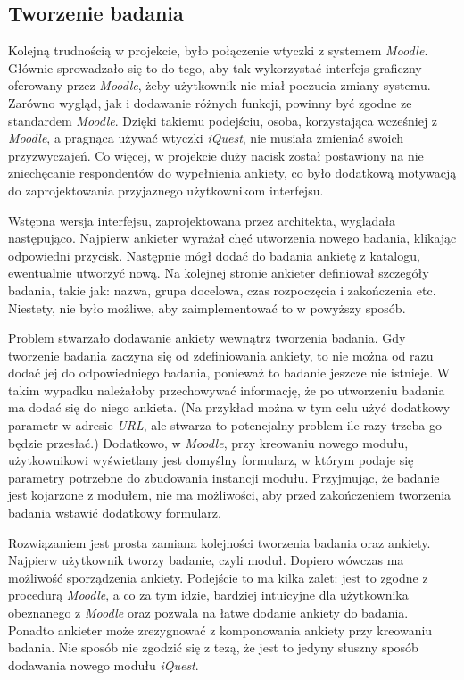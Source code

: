 \subsection{Tworzenie badania}
Kolejną trudnością w projekcie, było połączenie wtyczki z systemem \emph{Moodle}. Głównie sprowadzało się to do tego, aby tak wykorzystać interfejs graficzny oferowany przez \emph{Moodle}, żeby użytkownik nie miał poczucia zmiany systemu. Zarówno wygląd, jak i dodawanie różnych funkcji, powinny być zgodne ze standardem \emph{Moodle}. Dzięki takiemu podejściu, osoba, korzystająca wcześniej z \emph{Moodle}, a pragnąca używać wtyczki \emph{iQuest}, nie musiała zmieniać swoich przyzwyczajeń. Co więcej, w projekcie duży nacisk został postawiony na nie zniechęcanie respondentów do wypełnienia ankiety, co było dodatkową motywacją do zaprojektowania przyjaznego użytkownikom interfejsu.

Wstępna wersja interfejsu, zaprojektowana przez architekta, wyglądała następująco. Najpierw ankieter wyrażał chęć utworzenia nowego badania, klikając odpowiedni przycisk. Następnie mógł dodać do badania ankietę z katalogu, ewentualnie utworzyć nową. Na kolejnej stronie ankieter definiował szczegóły badania, takie jak: nazwa, grupa docelowa, czas rozpoczęcia i zakończenia etc. Niestety, nie było możliwe, aby zaimplementować to w powyższy sposób.

Problem stwarzało dodawanie ankiety wewnątrz tworzenia badania. Gdy tworzenie badania zaczyna się od zdefiniowania ankiety, to nie można od razu dodać jej do odpowiedniego badania, ponieważ to badanie jeszcze nie istnieje. W takim wypadku należałoby przechowywać informację, że po utworzeniu badania ma dodać się do niego ankieta. (Na przykład można w tym celu użyć dodatkowy parametr w adresie \emph{URL}, ale stwarza to potencjalny problem ile razy trzeba go będzie przesłać.) Dodatkowo, w \emph{Moodle}, przy kreowaniu nowego modułu, użytkownikowi wyświetlany jest domyślny formularz, w którym podaje się parametry potrzebne do zbudowania instancji modułu. Przyjmując, że badanie jest kojarzone z modułem, nie ma możliwości, aby przed zakończeniem tworzenia badania wstawić dodatkowy formularz.

Rozwiązaniem jest prosta zamiana kolejności tworzenia badania oraz ankiety. Najpierw użytkownik tworzy badanie, czyli moduł. Dopiero wówczas ma możliwość sporządzenia ankiety. Podejście to ma kilka zalet: jest to zgodne z procedurą \emph{Moodle}, a co za tym idzie, bardziej intuicyjne dla użytkownika obeznanego z \emph{Moodle} oraz pozwala na łatwe dodanie ankiety do badania. Ponadto ankieter może zrezygnować z komponowania ankiety przy kreowaniu badania. Nie sposób nie zgodzić się z tezą, że jest to jedyny słuszny sposób dodawania nowego modułu \emph{iQuest}.

